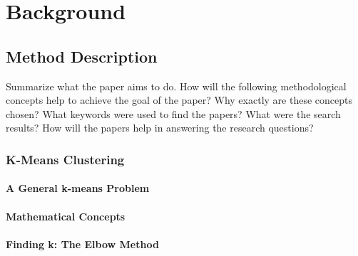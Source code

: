 \chapter{Background}
\label{cha:background}

\section{Method Description}
\label{sec:method_description}
Summarize what the paper aims to do.
How will the following methodological concepts help to achieve the goal of the paper?
Why exactly are these concepts chosen?
What keywords were used to find the papers?
What were the search results?
How will the papers help in answering the research questions?





%

\subsection{K-Means Clustering}
\label{subsec:k_means_clustering}
\subsubsection{A General k-means Problem}
\subsubsection{Mathematical Concepts}
\subsubsection{Finding k: The Elbow Method}
